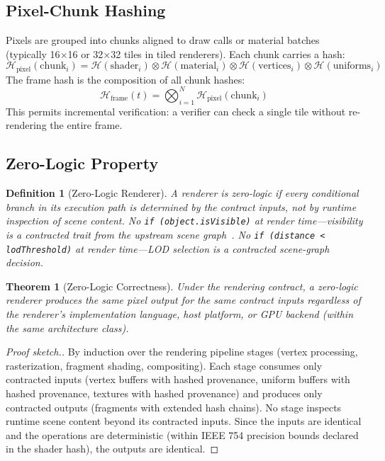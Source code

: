 \documentclass[sigconf,nonacm]{acmart}
\newcommand{\hashfn}{\mathcal{H}}
\newcommand{\tropmult}{\otimes}
\newcommand{\pixelhash}{\hashfn_{\text{pixel}}}
\newcommand{\framehash}{\hashfn_{\text{frame}}}
\newtheorem{definition}{Definition}
\newtheorem{theorem}{Theorem}
\begin{document}
\subsection{Pixel-Chunk Hashing}

Pixels are grouped into chunks aligned to draw calls or
material batches (typically 16$\times$16 or 32$\times$32 tiles
in tiled renderers). Each chunk carries a hash:
$$\pixelhash(\text{chunk}_i) = \hashfn(\text{shader}_i)
  \tropmult \hashfn(\text{material}_i)
  \tropmult \hashfn(\text{vertices}_i)
  \tropmult \hashfn(\text{uniforms}_i)$$
The frame hash is the composition of all chunk hashes:
$$\framehash(t) = \bigotimes_{i=1}^{N} \pixelhash(\text{chunk}_i)$$
This permits incremental verification: a verifier can check a
single tile without re-rendering the entire frame.

\subsection{Zero-Logic Property}
\begin{definition}[Zero-Logic Renderer]
A renderer is \emph{zero-logic} if every conditional branch
in its execution path is determined by the contract inputs,
not by runtime inspection of scene content. No
\texttt{if (object.isVisible)} at render time---visibility is
a contracted trait from the upstream scene
graph~\cite{paper-11-hsplus-ecoop2027}. No
\texttt{if (distance < lodThreshold)} at render time---LOD
selection is a contracted scene-graph decision.
\end{definition}

\begin{theorem}[Zero-Logic Correctness]
Under the rendering contract, a zero-logic renderer produces
the same pixel output for the same contract inputs regardless
of the renderer's implementation language, host platform, or
GPU backend (within the same architecture class).
\end{theorem}

\begin{proof}[Proof sketch.]
By induction over the rendering pipeline stages (vertex
processing, rasterization, fragment shading, compositing).
Each stage consumes only contracted inputs (vertex buffers
with hashed provenance, uniform buffers with hashed
provenance, textures with hashed provenance) and produces
only contracted outputs (fragments with extended hash chains).
No stage inspects runtime scene content beyond its contracted
inputs. Since the inputs are identical and the operations are
deterministic (within IEEE 754 precision bounds declared in
the shader hash), the outputs are identical.
\end{proof}
\end{document}
